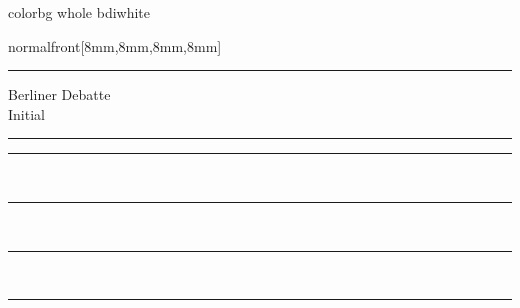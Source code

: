 \documentclass[
    coverwidth=160mm,
    coverheight=227mm,
    spinewidth=9mm,
    markcolor=black,
    marklength=8mm,
    trimmed=true,
    ]
    {bookcover}
\begin{document}
    \begin{bookcover}
        \begin{bookcoverelement}{color}{bg whole}
        bdiwhite
        \end{bookcoverelement}
        
        \begin{bookcoverelement}{normal}{front}[8mm,8mm,8mm,8mm]
            \hrule
            \begin{center}
                {\bdilogo Berliner Debatte\\Initial\par}
            \end{center}
            \hrule
            \begin{center}
                \vspace{10pt}
                {\bdinumber \color{bdired} \Auflage}
                \vspace{10pt}
            \end{center}
       
            \par\noindent\rule{72mm}{0.4pt}\\
            {\bdivolume{\color{bdired} {33. Jg. 2022}}}
            \begin{center}
                \bdicover {\bfseries \bdiTitle}
            \end{center}
            \bigskip
            
            \hspace{72mm}\noindent\rule{72mm}{0.4pt}\\\bigskip
            \hfill{\bdivolume{\autorEins}}
            \begin{center}
                \bdicover \artikelEins
            \end{center}
            \bigskip

            \par\noindent\rule{72mm}{0.4pt}\\
            {\bdivolume{\autorZwei}}
            \begin{center}
                \bdicover \artikelZwei
            \end{center}
            \bigskip

            \hspace{72mm}\noindent\rule{72mm}{0.4pt}\\\bigskip
            \hfill{\bdivolume{\autorDrei}}
            \begin{center}
                \bdicover \artikelDrei
            \end{center}
            \bigskip


\end{bookcoverelement}
\end{bookcover}
\end{document}
